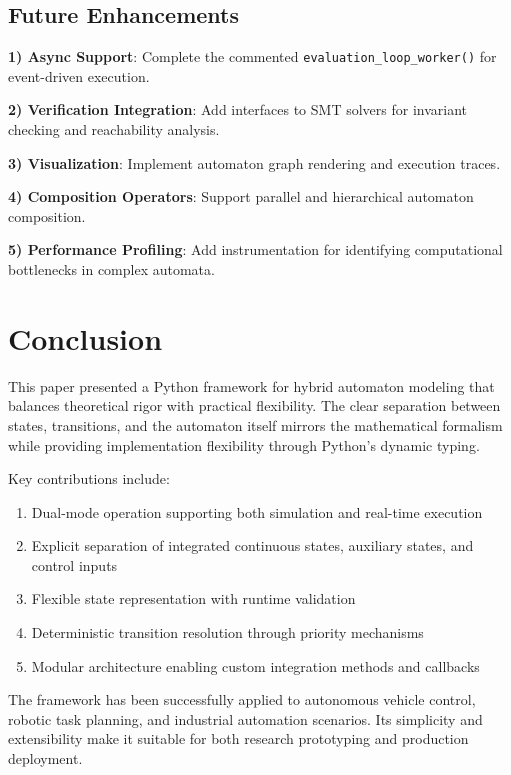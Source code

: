 \documentclass[conference]{IEEEtran}
\begin{document}
\subsection{Future Enhancements}

\textbf{1) Async Support}: Complete the commented \texttt{evaluation\_loop\_worker()} for event-driven execution.

\textbf{2) Verification Integration}: Add interfaces to SMT solvers for invariant checking and reachability analysis.

\textbf{3) Visualization}: Implement automaton graph rendering and execution traces.

\textbf{4) Composition Operators}: Support parallel and hierarchical automaton composition.

\textbf{5) Performance Profiling}: Add instrumentation for identifying computational bottlenecks in complex automata.

\section{Conclusion}

This paper presented a Python framework for hybrid automaton modeling that balances theoretical rigor with practical flexibility. The clear separation between states, transitions, and the automaton itself mirrors the mathematical formalism while providing implementation flexibility through Python's dynamic typing.

Key contributions include:

\begin{enumerate}
\item Dual-mode operation supporting both simulation and real-time execution
\item Explicit separation of integrated continuous states, auxiliary states, and control inputs
\item Flexible state representation with runtime validation
\item Deterministic transition resolution through priority mechanisms
\item Modular architecture enabling custom integration methods and callbacks
\end{enumerate}

The framework has been successfully applied to autonomous vehicle control, robotic task planning, and industrial automation scenarios. Its simplicity and extensibility make it suitable for both research prototyping and production deployment.
\end{document}
